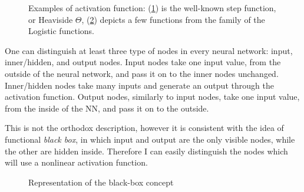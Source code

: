 \begin{figure}[ht]
	\begin{subfigure}[b]{0.49\textwidth}
		\centering
		
		\caption{}
		\label{fig:activation_function_example_1}
  \end{subfigure}
  \begin{subfigure}[b]{0.49\textwidth}
  		\centering
		
		\caption{}
		\label{fig:activation_function_example_2}
  \end{subfigure}
  \caption{Examples of activation function: (\ref{fig:activation_function_example_1}) is the well-known step function, or Heaviside $\Theta$, (\ref{fig:activation_function_example_2}) depicts a few functions from the family of the Logistic functions.}
  	\label{fig:activation_function_examples}
\end{figure}

One can distinguish at least three type of nodes in every neural network: input, inner/hidden, and output nodes.
Input nodes take one input value, from the outside of the neural network, and pass it on to the inner nodes unchanged.
Inner/hidden nodes take many inputs and generate an output through the activation function.
Output nodes, similarly to input nodes, take one input value, from the inside of the NN, and pass it on to the outside.

This is not the orthodox description, however it is consistent with the idea of functional \textit{black box}, in which input and output are the only visible nodes, while the other are hidden inside.
Therefore I can easily distinguish the nodes which will use a nonlinear activation function.

\begin{figure}[ht]
	\centering
	
	\caption{Representation of the black-box concept}
	\label{fig:black_box_NN}
\end{figure}



